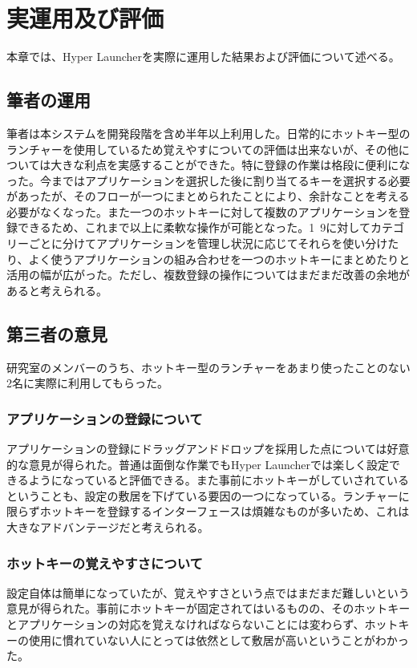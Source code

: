 \chapter{実運用及び評価}
本章では、Hyper Launcherを実際に運用した結果および評価について述べる。

\newpage

\section{筆者の運用}
筆者は本システムを開発段階を含め半年以上利用した。日常的にホットキー型のランチャーを使用しているため覚えやすについての評価は出来ないが、その他については大きな利点を実感することができた。特に登録の作業は格段に便利になった。今まではアプリケーションを選択した後に割り当てるキーを選択する必要があったが、そのフローが一つにまとめられたことにより、余計なことを考える必要がなくなった。また一つのホットキーに対して複数のアプリケーションを登録できるため、これまで以上に柔軟な操作が可能となった。1~9に対してカテゴリーごとに分けてアプリケーションを管理し状況に応じてそれらを使い分けたり、よく使うアプリケーションの組み合わせを一つのホットキーにまとめたりと活用の幅が広がった。ただし、複数登録の操作についてはまだまだ改善の余地があると考えられる。

\section{第三者の意見}
研究室のメンバーのうち、ホットキー型のランチャーをあまり使ったことのない2名に実際に利用してもらった。

\subsection{アプリケーションの登録について}
アプリケーションの登録にドラッグアンドドロップを採用した点については好意的な意見が得られた。普通は面倒な作業でもHyper Launcherでは楽しく設定できるようになっていると評価できる。また事前にホットキーがしていされているということも、設定の敷居を下げている要因の一つになっている。ランチャーに限らずホットキーを登録するインターフェースは煩雑なものが多いため、これは大きなアドバンテージだと考えられる。

\subsection{ホットキーの覚えやすさについて}
設定自体は簡単になっていたが、覚えやすさという点ではまだまだ難しいという意見が得られた。事前にホットキーが固定されてはいるものの、そのホットキーとアプリケーションの対応を覚えなければならないことには変わらず、ホットキーの使用に慣れていない人にとっては依然として敷居が高いということがわかった。

